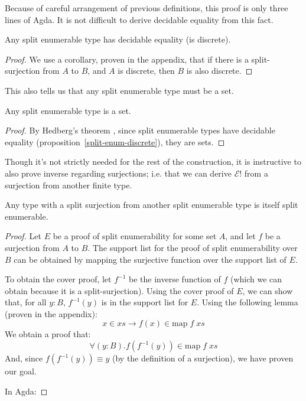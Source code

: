 Because of careful arrangement of previous definitions, this proof is only three
lines of Agda.
It is not difficult to derive decidable equality from this fact.
\begin{lemma} \label{split-enum-discrete}
  Any split enumerable type has decidable equality (is discrete).
\end{lemma}
\begin{proof}
  We use a corollary, proven in the appendix, that if there is a
  split-surjection from \(A\) to \(B\), and \(A\) is discrete, then \(B\) is
  also discrete.
\end{proof}

This also tells us that any split enumerable type must be a set.
\begin{lemma}
  Any split enumerable type is a set.
\end{lemma}
\begin{proof}
  By Hedberg's theorem \cite{hedbergCoherenceTheoremMartinLof1998}, since split
  enumerable types have decidable equality
  (proposition~\ref{split-enum-discrete}), they are sets.
\end{proof}

Though it's not strictly needed for the rest of the construction, it is
instructive to also prove inverse regarding surjections; i.e. that we can
derive \(\mathcal{E}!\) from a surjection from another finite type.
\begin{lemma} \label{split-enum-from-surj}
  Any type with a split surjection from another split enumerable type is itself
  split enumerable.
\end{lemma}
\begin{proof}
  Let \(E\) be a proof of split enumerability for some set \(A\), and let \(f\)
  be a surjection from \(A\) to \(B\).
  The support list for the proof of split enumerability over \(B\) can be
  obtained by mapping the surjective function over the support list of \(E\).

  To obtain the cover proof, let \(f^{-1}\) be the inverse function of \(f\)
  (which we can obtain because it is a split-surjection).
  Using the cover proof of \(E\), we can show that, for all \(y : B\), \(f^{-1}(y)\)
  is in the support list for \(E\).
  Using the following lemma (proven in the appendix):
  \begin{equation}
    x \in xs \rightarrow f (x) \in \text{map} \; f \; \mathit{xs}
  \end{equation}
  We obtain a proof that:
  \begin{equation}
    \forall (y : B). f (f^{-1}(y)) \in \text{map} \; f \; \mathit{xs}
  \end{equation}
  And, since \(f (f^{-1}(y)) \equiv y\) (by the definition of a surjection), we
  have proven our goal.

  In Agda:
\end{proof}
